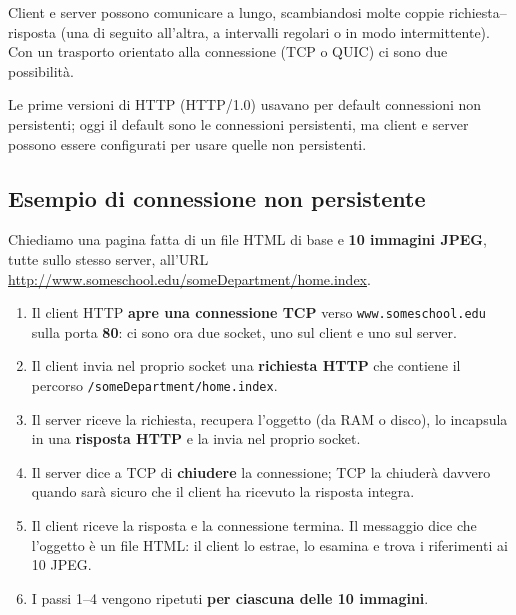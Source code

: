 Client e server possono comunicare a lungo, scambiandosi molte coppie richiesta--risposta (una di
seguito all'altra, a intervalli regolari o in modo intermittente). Con un trasporto orientato alla
connessione (TCP o QUIC) ci sono due possibilità.


Le prime versioni di HTTP (HTTP/1.0) usavano per default connessioni non persistenti; oggi il default
sono le connessioni persistenti, ma client e server possono essere configurati per usare quelle non
persistenti.

\subsection{Esempio di connessione non persistente}

Chiediamo una pagina fatta di un file HTML di base e \textbf{10 immagini JPEG}, tutte sullo stesso
server, all'URL \url{http://www.someschool.edu/someDepartment/home.index}.

\begin{enumerate}
    \item Il client HTTP \textbf{apre una connessione TCP} verso \texttt{www.someschool.edu} sulla porta
          \textbf{80}: ci sono ora due socket, uno sul client e uno sul server.
    \item Il client invia nel proprio socket una \textbf{richiesta HTTP} che contiene il percorso
          \texttt{/someDepartment/home.index}.
    \item Il server riceve la richiesta, recupera l'oggetto (da RAM o disco), lo incapsula in una
          \textbf{risposta HTTP} e la invia nel proprio socket.
    \item Il server dice a TCP di \textbf{chiudere} la connessione; TCP la chiuderà davvero quando sarà
          sicuro che il client ha ricevuto la risposta integra.
    \item Il client riceve la risposta e la connessione termina. Il messaggio dice che l'oggetto è un file
          HTML: il client lo estrae, lo esamina e trova i riferimenti ai 10 JPEG.
    \item I passi 1--4 vengono ripetuti \textbf{per ciascuna delle 10 immagini}.
\end{enumerate}

